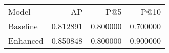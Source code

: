\begin{tabular}{lrrr}
Model & AP & P@5 & P@10 \\
Baseline & 0.812891 & 0.800000 & 0.700000 \\
Enhanced & 0.850848 & 0.800000 & 0.900000 \\
\end{tabular}
